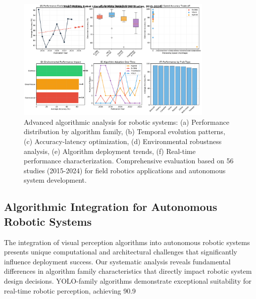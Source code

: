 \documentclass[a4paper,fleqn]{cas-dc}
\begin{document}
\begin{figure}[htbp]
\centering
\includegraphics[width=0.85\textwidth]{fig_comprehensive_meta_analysis.pdf}
\caption{Advanced algorithmic analysis for robotic systems: (a) Performance distribution by algorithm family, (b) Temporal evolution patterns, (c) Accuracy-latency optimization, (d) Environmental robustness analysis, (e) Algorithm deployment trends, (f) Real-time performance characterization. Comprehensive evaluation based on 56 studies (2015-2024) for field robotics applications and autonomous system development.}
\label{fig:ras_meta_analysis}
\end{figure}

\subsection{Algorithmic Integration for Autonomous Robotic Systems}
The integration of visual perception algorithms into autonomous robotic systems presents unique computational and architectural challenges that significantly influence deployment success. Our systematic analysis reveals fundamental differences in algorithm family characteristics that directly impact robotic system design decisions. YOLO-family algorithms demonstrate exceptional suitability for real-time robotic perception, achieving 90.9%
\end{document}
